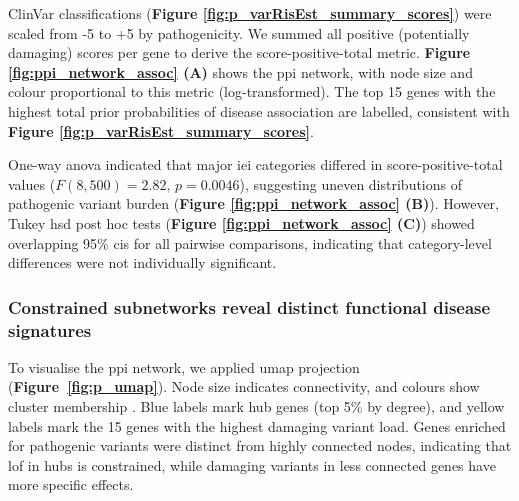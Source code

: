 ClinVar classifications (\textbf{Figure \ref{fig:p_varRisEst_summary_scores}}) were scaled from -5 to +5 by pathogenicity. 
We summed all positive (potentially damaging) scores per gene to derive the score-positive-total metric. 
\textbf{Figure \ref{fig:ppi_network_assoc} (A)} shows the \ac{ppi} network, with node size and colour proportional to this metric (log-transformed). 
The top 15 genes with the highest total prior probabilities of disease association are labelled, consistent with \textbf{Figure \ref{fig:p_varRisEst_summary_scores}}.

One-way \ac{anova} indicated that major \ac{iei} categories differed in score-positive-total values (\(F(8,500)=2.82,\,p=0.0046\)), suggesting uneven distributions of pathogenic variant burden (\textbf{Figure \ref{fig:ppi_network_assoc} (B)}). 
However, Tukey \ac{hsd} post hoc tests (\textbf{Figure \ref{fig:ppi_network_assoc} (C)}) showed overlapping 95\% \ac{ci}s for all pairwise comparisons, indicating that category-level differences were not individually significant.


\FloatBarrier
\subsubsection*{Constrained subnetworks reveal distinct functional disease signatures}

To visualise the \ac{ppi} network, we applied \ac{umap} projection (\textbf{Figure~\ref{fig:p_umap}}). Node size indicates connectivity, and colours show cluster membership \cite{szklarczyk2025string}. Blue labels mark hub genes (top 5\% by degree), and yellow labels mark the 15 genes with the highest damaging variant load. Genes enriched for pathogenic variants were distinct from highly connected nodes, indicating that \ac{lof} in hubs is constrained, while damaging variants in less connected genes have more specific effects.

